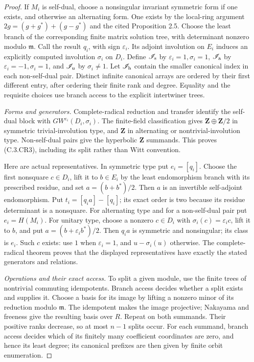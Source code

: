 \begin{proof}
If $M_i$ is self-dual, choose a nonsingular invariant
symmetric form if one exists, and otherwise an
alternating form. One exists by the local-ring
argument $2g=(g+g^*)+(g-g^*)$ and the cited
Proposition 2.5. Choose the least branch of the
corresponding finite matrix solution tree, with
determinant nonzero modulo $\mathfrak m$.
Call the result $q_i$, with sign $\varepsilon_i$.
Its adjoint involution on $E_i$ induces an explicitly
computed involution $\sigma_i$ on $D_i$.
Define $\mathscr I_{\rm s}$ by
$\varepsilon_i=1,\sigma_i=1$,
$\mathscr I_{\rm a}$ by
$\varepsilon_i=-1,\sigma_i=1$, and
$\mathscr I_{\rm u}$ by $\sigma_i\ne1$.
Let $\mathscr I_{\rm h}$ contain the smaller canonical
index in each non-self-dual pair. Distinct infinite
canonical arrays are ordered by their first different
entry, after ordering their finite rank and degree.
Equality and the requisite choices use branch access
to the explicit intertwiner trees.

\emph{Forms and generators.}
Complete-radical reduction and transfer identify the
self-dual block with $GW^{\varepsilon_i}(D_i,\sigma_i)$.
The finite-field classification
\cite[Lemma 3.1(a),(b)]{C-SergeichukFiniteForms}
gives $\mathbf Z\oplus\mathbf Z/2$ in symmetric
trivial-involution type, and $\mathbf Z$ in alternating
or nontrivial-involution type. Non-self-dual pairs
give the hyperbolic $\mathbf Z$ summands.
This proves (C.3.CR3), including its split rather
than Witt convention.

Here are actual representatives. In symmetric type
put $e_i=[q_i]$. Choose the first nonsquare
$c\in D_i$, lift it to $b\in E_i$ by the least
endomorphism branch with its prescribed residue,
and set $a=(b+b^*)/2$.
Then $a$ is an invertible self-adjoint endomorphism.
Put $t_i=[q_i a]-[q_i]$; its exact order is two
because its residue determinant is a nonsquare.
For alternating type and for a non-self-dual pair
put $e_i=H(M_i)$.
For unitary type, choose a nonzero $c\in D_i$ with
$\sigma_i(c)=\varepsilon_i c$, lift it to $b$, and
put $a=(b+\varepsilon_i b^*)/2$.
Then $q_i a$ is symmetric and nonsingular; its
class is $e_i$. Such $c$ exists: use $1$ when
$\varepsilon_i=1$, and $u-\sigma_i(u)$ otherwise.
The complete-radical theorem proves that the displayed
representatives have exactly the stated generators
and relations.

\emph{Operations and their exact access.}
To split a given module, use the finite trees of
nontrivial commuting idempotents. Branch access
decides whether a split exists and supplies it.
Choose a basis for its image by lifting a nonzero
minor of its reduction modulo $\mathfrak m$.
The idempotent makes the image projective; Nakayama
and freeness give the resulting basis over $R$.
Repeat on both summands. Their positive ranks
decrease, so at most $n-1$ splits occur.
For each summand, branch access decides which
of its finitely many coefficient coordinates
are zero, and hence its least degree; its canonical
prefixes are then given by finite orbit enumeration.


\end{proof}
